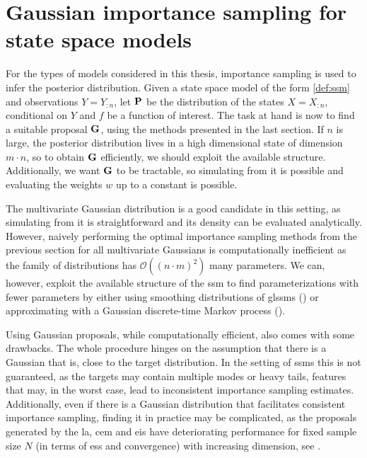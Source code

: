 \section{Gaussian importance sampling for state space models}
\label{sec:gaussian_importance_sampling_for_state_space_models}

For the types of models considered in this thesis, importance sampling is used to infer the posterior distribution. Given a state space model of the form \eqref{def:ssm} and observations $Y = Y_{:n}$, let $\P$ be the distribution of the states $X=X_{:n}$, conditional on $Y$ and $f$ be a function of interest. The task at hand is now to find a suitable proposal $\G$, using the methods presented in the last section. If $n$ is large, the posterior distribution lives in a high dimensional state of dimension $m\cdot n$, so to obtain $\G$ efficiently, we should exploit the available structure. Additionally, we want $\G$ to be tractable, so simulating from it is possible and evaluating the weights $w$ up to a constant is possible. 

The multivariate Gaussian distribution is a good candidate in this setting, as simulating from it is straightforward and its density can be evaluated analytically. However, naively performing the optimal importance sampling methods from the previous section for all multivariate Gaussians is computationally inefficient as the family of distributions has $\mathcal O((n\cdot m)^{2})$ many parameters. We can, however, exploit the available structure of the \gls{ssm} to find parameterizations with fewer parameters by either using smoothing distributions of \glspl{glssm} () or approximating with a Gaussian discrete-time Markov process (). 

Using Gaussian proposals, while computationally efficient, also comes with some drawbacks. The whole procedure hinges on the assumption that there is a Gaussian that is, close to the target distribution. In the setting of \glspl{ssm} this is not guaranteed, as the targets may contain multiple modes or heavy tails, features that may, in the worst case, lead to inconsistent importance sampling estimates. %
Additionally, even if there is a Gaussian distribution that facilitates consistent importance sampling, finding it in practice may be complicated, as the proposals generated by the \gls{la}, \gls{cem} and \gls{eis} have deteriorating performance for fixed sample size $N$ (in terms of \gls{ess} and convergence) with increasing dimension, see .

